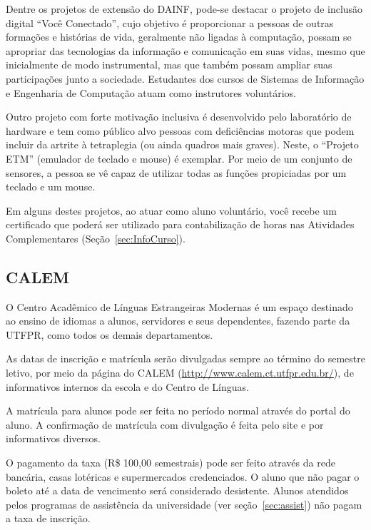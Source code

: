 \documentclass[a4paper,12pt,openany]{article}
\begin{document}
Dentre os projetos de extensão do DAINF, pode-se destacar o projeto de inclusão digital ``Você Conectado'', cujo objetivo é proporcionar a pessoas de outras formações e histórias de vida, geralmente não ligadas à computação, possam se apropriar das tecnologias da informação e comunicação em suas vidas, mesmo que inicialmente de modo instrumental, mas que também possam ampliar suas participações junto a sociedade. Estudantes dos cursos de Sistemas de Informação e Engenharia de Computação atuam como instrutores voluntários. 

Outro projeto com forte motivação inclusiva é desenvolvido pelo laboratório de hardware e tem como público alvo pessoas com deficiências motoras que podem incluir da artrite à tetraplegia (ou ainda quadros mais graves). Neste, o ``Projeto ETM'' (emulador de teclado e mouse) é exemplar. Por meio de um conjunto de sensores, a pessoa se vê capaz de utilizar todas as funções propiciadas por um teclado e um mouse. 

Em alguns destes projetos, ao atuar como aluno voluntário, você recebe um certificado que poderá ser utilizado para contabilização de horas nas Atividades Complementares (Seção~\ref{sec:InfoCurso}).

\subsection{CALEM}

O Centro Acadêmico de Línguas Estrangeiras Modernas é um espaço destinado ao ensino de idiomas a alunos, servidores e seus dependentes,  fazendo parte da UTFPR, como todos os demais departamentos.

As datas de inscrição e matrícula serão divulgadas sempre ao término do semestre letivo, por meio da página do CALEM (\url{http://www.calem.ct.utfpr.edu.br/}), de informativos internos da escola e do Centro de Línguas.

A matrícula para alunos pode ser feita no período normal através do portal do aluno. A confirmação de matrícula com divulgação é feita pelo site e por informativos diversos.

O pagamento da taxa (R\$ 100,00 semestrais) pode ser feito através da rede bancária, casas lotéricas e supermercados credenciados. O aluno que não pagar o boleto até a data de vencimento será considerado desistente. Alunos atendidos pelos programas de assistência da universidade (ver seção~\ref{sec:assist}) não pagam a taxa de inscrição.
\end{document}
